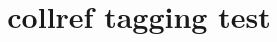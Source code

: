 \documentclass{article}
\title{collref tagging test}
\begin{document}
\cite{inbook-full}

\cite{article-full,whole-set,manual-full}



\end{document}
